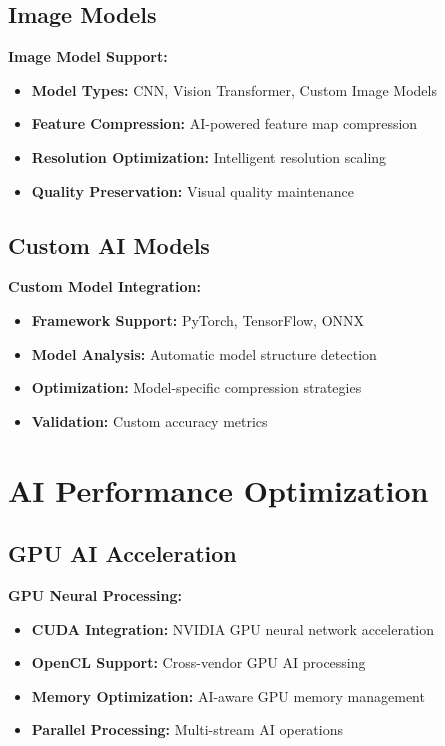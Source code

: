 \documentclass[12pt,a4paper]{article}
\begin{document}
\subsection{Image Models}

\textbf{Image Model Support:}
\begin{itemize}
    \item \textbf{Model Types:} CNN, Vision Transformer, Custom Image Models
    \item \textbf{Feature Compression:} AI-powered feature map compression
    \item \textbf{Resolution Optimization:} Intelligent resolution scaling
    \item \textbf{Quality Preservation:} Visual quality maintenance
\end{itemize}

\subsection{Custom AI Models}

\textbf{Custom Model Integration:}
\begin{itemize}
    \item \textbf{Framework Support:} PyTorch, TensorFlow, ONNX
    \item \textbf{Model Analysis:} Automatic model structure detection
    \item \textbf{Optimization:} Model-specific compression strategies
    \item \textbf{Validation:} Custom accuracy metrics
\end{itemize}

\section{AI Performance Optimization}

\subsection{GPU AI Acceleration}

\textbf{GPU Neural Processing:}
\begin{itemize}
    \item \textbf{CUDA Integration:} NVIDIA GPU neural network acceleration
    \item \textbf{OpenCL Support:} Cross-vendor GPU AI processing
    \item \textbf{Memory Optimization:} AI-aware GPU memory management
    \item \textbf{Parallel Processing:} Multi-stream AI operations
\end{itemize}
\end{document}
